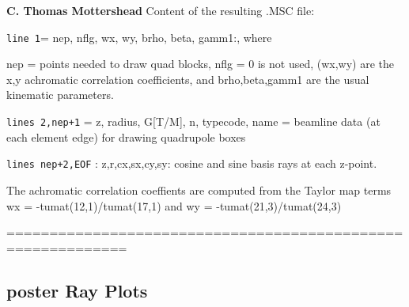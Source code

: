 \documentclass[11pt]{article} %
\newcommand{\sub}{\subsection}
\newcommand{\edes}{\end{description}}
\newcommand{\vb}{\verb ;}
\begin{document}
\begin{center}  {\bf C. Thomas Mottershead }
  Content of the resulting .MSC file:
	
	\vb line 1;= {\sc nep, nflg, wx, wy, brho, beta, gamm1}:, where

	 {\sc nep}  = points needed to draw quad blocks,  {\sc nflg} = 0 is not used,
{\sc (wx,wy)} are the x,y achromatic correlation coefficients, and {\sc brho,beta,gamm1} are the usual kinematic parameters.

   \vb lines 2,nep+1; = z, radius, G[T/M], n, typecode, name = beamline data  \newline (at each element edge) for drawing quadrupole boxes

	\vb lines nep+2,EOF; :  z,r,cx,sx,cy,sy: cosine and sine basis rays at each z-point. 

The achromatic correlation coeffients are computed from the Taylor map terms \newline
{\sc wx} = -tumat(12,1)/tumat(17,1) and \newline
{\sc wy} = -tumat(21,3)/tumat(24,3)      


============================================================
\sub{{\sc poster} Ray Plots}


\end{center}
\end{document}
